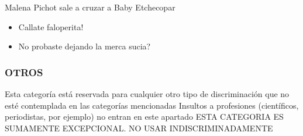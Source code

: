 \begin{displayquote}
     Malena Pichot sale a cruzar a Baby Etchecopar

    \begin{itemize}
        \item Callate faloperita!
        \item No probaste dejando la merca sucia?
    \end{itemize}
\end{displayquote}



\subsubsection{OTROS}

Esta categoría está reservada para cualquier otro tipo de discriminación que no esté contemplada en las categorías mencionadas
Insultos a profesiones (científicos, periodistas, por ejemplo) no entran en este apartado
ESTA CATEGORIA ES SUMAMENTE EXCEPCIONAL. NO USAR INDISCRIMINADAMENTE
